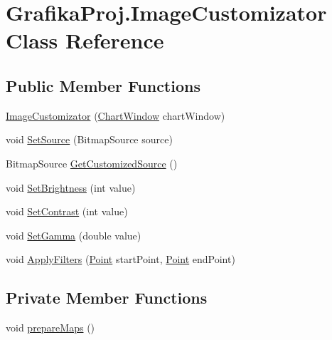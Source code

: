 \hypertarget{class_grafika_proj_1_1_image_customizator}{}\section{Grafika\+Proj.\+Image\+Customizator Class Reference}
\label{class_grafika_proj_1_1_image_customizator}
\subsection*{Public Member Functions}
\begin{DoxyCompactItemize}
\item 
\mbox{\hyperlink{class_grafika_proj_1_1_image_customizator_a9dc6834aafa5c3039a7b465978259547}{Image\+Customizator}} (\mbox{\hyperlink{class_grafika_proj_1_1_chart_window}{Chart\+Window}} chart\+Window)
\item 
void \mbox{\hyperlink{class_grafika_proj_1_1_image_customizator_a5d95b9b8b484b02d0ca52bbbabb80511}{Set\+Source}} (Bitmap\+Source source)
\item 
Bitmap\+Source \mbox{\hyperlink{class_grafika_proj_1_1_image_customizator_a0935fd403698af0ed5cd681564f32a23}{Get\+Customized\+Source}} ()
\item 
void \mbox{\hyperlink{class_grafika_proj_1_1_image_customizator_ae3ae615f9b76e92d94966c79415739ec}{Set\+Brightness}} (int value)
\item 
void \mbox{\hyperlink{class_grafika_proj_1_1_image_customizator_ada6a76ab7246497018fe73209872ac04}{Set\+Contrast}} (int value)
\item 
void \mbox{\hyperlink{class_grafika_proj_1_1_image_customizator_a44ab9163ee2729921866ded0fdc2db01}{Set\+Gamma}} (double value)
\item 
void \mbox{\hyperlink{class_grafika_proj_1_1_image_customizator_a42cae11963d0ea1c15fc61b2f057c2a9}{Apply\+Filters}} (\mbox{\hyperlink{_main_window_8xaml_8cs_af7183cff3a6e75db2170da28384d7419}{Point}} start\+Point, \mbox{\hyperlink{_main_window_8xaml_8cs_af7183cff3a6e75db2170da28384d7419}{Point}} end\+Point)
\end{DoxyCompactItemize}
\subsection*{Private Member Functions}
\begin{DoxyCompactItemize}
\item 
void \mbox{\hyperlink{class_grafika_proj_1_1_image_customizator_aebbe7a12be72bdc6a983bb84d96bf2ec}{prepare\+Maps}} ()
\end{DoxyCompactItemize}
